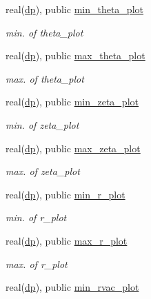 \begin{DoxyCompactItemize}
real(\hyperlink{namespacenum__vars_a03802aa2bd86439d7a9370836fabf3f2}{dp}), public \hyperlink{namespacenum__vars_a2085f22558c1b4a349b5ad1b6abfe09f}{min\+\_\+theta\+\_\+plot}
\begin{DoxyCompactList}\small\item\em min. of {\ttfamily theta\+\_\+plot} \end{DoxyCompactList}\item 
real(\hyperlink{namespacenum__vars_a03802aa2bd86439d7a9370836fabf3f2}{dp}), public \hyperlink{namespacenum__vars_ade6d14ac98ba7f573ef83194808f68b8}{max\+\_\+theta\+\_\+plot}
\begin{DoxyCompactList}\small\item\em max. of {\ttfamily theta\+\_\+plot} \end{DoxyCompactList}\item 
real(\hyperlink{namespacenum__vars_a03802aa2bd86439d7a9370836fabf3f2}{dp}), public \hyperlink{namespacenum__vars_a773a55cfd780f1f9db69887fdf48b0a5}{min\+\_\+zeta\+\_\+plot}
\begin{DoxyCompactList}\small\item\em min. of {\ttfamily zeta\+\_\+plot} \end{DoxyCompactList}\item 
real(\hyperlink{namespacenum__vars_a03802aa2bd86439d7a9370836fabf3f2}{dp}), public \hyperlink{namespacenum__vars_a2c2f75ebac91c6e5e122e41a62b71b6d}{max\+\_\+zeta\+\_\+plot}
\begin{DoxyCompactList}\small\item\em max. of {\ttfamily zeta\+\_\+plot} \end{DoxyCompactList}\item 
real(\hyperlink{namespacenum__vars_a03802aa2bd86439d7a9370836fabf3f2}{dp}), public \hyperlink{namespacenum__vars_ab3369f21aa4433cb6dc08957e477c015}{min\+\_\+r\+\_\+plot}
\begin{DoxyCompactList}\small\item\em min. of {\ttfamily r\+\_\+plot} \end{DoxyCompactList}\item 
real(\hyperlink{namespacenum__vars_a03802aa2bd86439d7a9370836fabf3f2}{dp}), public \hyperlink{namespacenum__vars_a1f9d7347043448d30c6612558ae569e5}{max\+\_\+r\+\_\+plot}
\begin{DoxyCompactList}\small\item\em max. of {\ttfamily r\+\_\+plot} \end{DoxyCompactList}\item 
real(\hyperlink{namespacenum__vars_a03802aa2bd86439d7a9370836fabf3f2}{dp}), public \hyperlink{namespacenum__vars_a9f2ea40c94edef5e9f10f3b5d154c2a3}{min\+\_\+rvac\+\_\+plot}

\end{DoxyCompactItemize}
